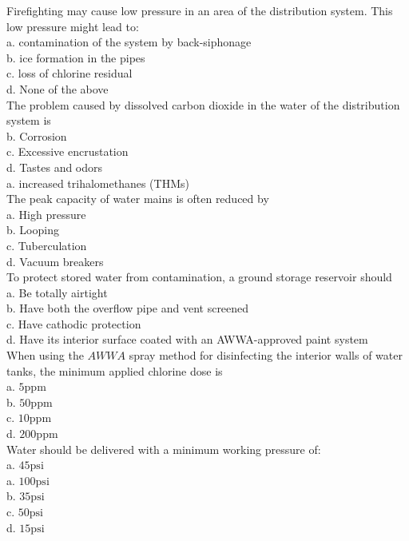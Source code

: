 Firefighting may cause low pressure in an area of the distribution system. This low pressure might lead to:\\
a. contamination of the system by back-siphonage\\
b. ice formation in the pipes\\
c. loss of chlorine residual\\
d. None of the above\\

The problem caused by dissolved carbon dioxide in the water of the distribution system is\\
b.  Corrosion\\
c. Excessive encrustation\\
d. Tastes and odors\\
a. increased trihalomethanes (THMs)\\

The peak capacity of water mains is often reduced by\\
a. High pressure\\
b. Looping\\
c. Tuberculation\\
d. Vacuum breakers\\

To protect stored water from contamination, a ground storage reservoir should\\
a. Be totally airtight\\
b. Have both the overflow pipe and vent screened\\
c. Have cathodic protection\\
d. Have its interior surface coated with an AWWA-approved paint system\\

When using the $A W W A$ spray method for disinfecting the interior walls of water tanks, the minimum applied chlorine dose is\\
a. $5 \mathrm{ppm}$\\
b. $50 \mathrm{ppm}$\\
c. $10 \mathrm{ppm}$\\
d. $200 \mathrm{ppm}$\\

Water should be delivered with a minimum working pressure of:\\
a. $45 \mathrm{psi}$\\
a. $100 \mathrm{psi}$\\
b. $35 \mathrm{psi}$\\
c. $50 \mathrm{psi}$\\
d. $15 \mathrm{psi}$\\

